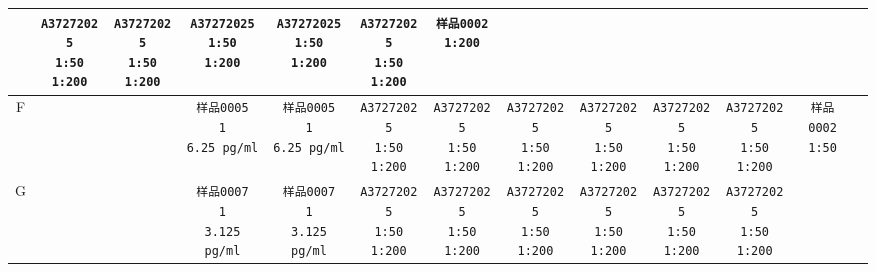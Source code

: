 \documentclass[UTF8,10pt,a4paper,fontset=fandol]{ctexart}
\begin{document}
\begin{center}
{\begin{tabular}{c|c|c|c|c|c|c|c|c|c|c|c|c}
  & \texttt{A37272025\\1:50\\1:200}
  & \texttt{A37272025\\1:50\\1:200}
  & \texttt{A37272025\\1:50\\1:200}
  & \texttt{A37272025\\1:50\\1:200}
  & \texttt{A37272025\\1:50\\1:200}
  & \texttt{样品0002\\1:200}
  & \\
\hline
F & &
  & \texttt{样品0005\\1\\6.25 pg/ml}
  & \texttt{样品0005\\1\\6.25 pg/ml}
  & \texttt{A37272025\\1:50\\1:200}
  & \texttt{A37272025\\1:50\\1:200}
  & \texttt{A37272025\\1:50\\1:200}
  & \texttt{A37272025\\1:50\\1:200}
  & \texttt{A37272025\\1:50\\1:200}
  & \texttt{A37272025\\1:50\\1:200}
  & \texttt{样品0002\\1:50}
  & \\
\hline
G & &
  & \texttt{样品0007\\1\\3.125 pg/ml}
  & \texttt{样品0007\\1\\3.125 pg/ml}
  & \texttt{A37272025\\1:50\\1:200}
  & \texttt{A37272025\\1:50\\1:200}
  & \texttt{A37272025\\1:50\\1:200}
  & \texttt{A37272025\\1:50\\1:200}
  & \texttt{A37272025\\1:50\\1:200}
  & \texttt{A37272025\\1:50\\1:200}

\end{tabular}}
\end{center}
\end{document}
